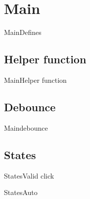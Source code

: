 \documentclass[aspectratio=169,10pt,t]{beamer}
\begin{document}
\section{Main}%
\label{sec:main}

\begin{frame}[t]{Main}{Defines}
	
\end{frame}

\subsection{Helper function}%
\label{sub:helper_function}


\begin{frame}[t]{Main}{Helper function}
	
\end{frame}

\subsection{Debounce}%
\label{sub:debounce}
\begin{frame}[t]{Main}{debounce}
	
\end{frame}

\subsection{States}%
\label{sub:states}


\begin{frame}[t]{States}{Valid click}
	\only<1>{
	
	}
	\only<2>{
	
	}
\end{frame}

\begin{frame}[t]{States}{Auto}
	
\end{frame}
\end{document}
